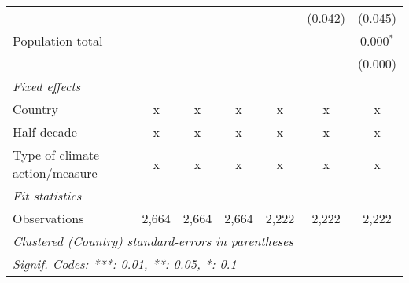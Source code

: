 \begin{tabular}{lcccccc}
                                                          &         &               &               &               & (0.042)       & (0.045)\\   
   Population total                                       &         &               &               &               &               & 0.000$^{*}$\\   
                                                          &         &               &               &               &               & (0.000)\\   
   \emph{Fixed effects}\\
   Country                                                & x       & x             & x             & x             & x             & x\\  
   Half decade                                            & x       & x             & x             & x             & x             & x\\  
   Type of climate action/measure                         & x       & x             & x             & x             & x             & x\\  
   \midrule \emph{Fit statistics}\\
   Observations                                           & 2,664   & 2,664         & 2,664         & 2,222         & 2,222         & 2,222\\  
   \midrule
   \multicolumn{7}{l}{\emph{Clustered (Country) standard-errors in parentheses}}\\
   \multicolumn{7}{l}{\emph{Signif. Codes: ***: 0.01, **: 0.05, *: 0.1}}\\
\end{tabular}
\par\endgroup


